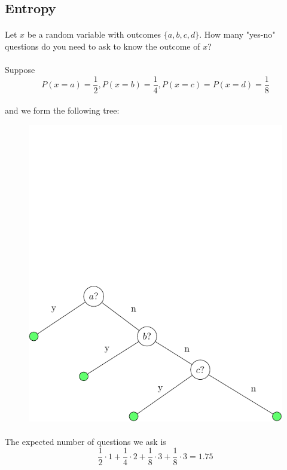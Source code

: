 \documentclass[letterpaper,12pt]{article}
\begin{document}
\subsection*{Entropy}
\paragraph{}Let $x$ be a random variable with outcomes $\{a,b,c,d\}$. How many "yes-no" questions
do you need to ask to know the outcome of $x$?

\paragraph{}Suppose
\[
    P(x=a) = \frac{1}{2}, P(x=b) = \frac{1}{4}, P(x=c)=P(x=d)= \frac{1}{8}
\]
\paragraph{}and we form the following tree:
\begin{figure}[H]
    \centering
    \includegraphics[scale=1]{images/entropy.pdf}
\end{figure}
\paragraph{}The expected number of questions we ask is
\[
    \frac{1}{2}\cdot1 + \frac{1}{4}\cdot2 + \frac{1}{8}\cdot3 + \frac{1}{8}\cdot3 = 1.75
\]
\end{document}
